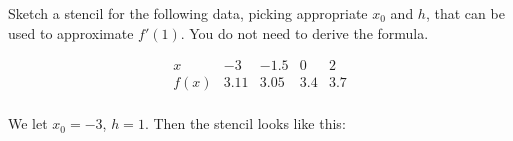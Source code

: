 \documentclass{eh-homework}
\begin{document}
\begin{question}{2}
Sketch a stencil for the following data, picking appropriate \(x_0\) and \(h\), that can be used to approximate \(f'(1)\). You do not need to derive the formula.

\[
\begin{array}{c|cccc}
x & -3 & -1.5 & 0 & 2 \\
\hline
f(x) & 3.11 & 3.05 & 3.4 & 3.7 \\
\end{array}
\]

\bigskip

We let \(x_0 = -3\), \(h = 1\). Then the stencil looks like this:
\begin{center}
\end{center}
\end{question}
\newpage
\end{document}
